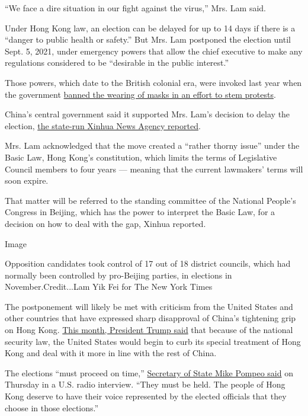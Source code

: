 ``We face a dire situation in our fight against the virus,'' Mrs. Lam
said.

Under Hong Kong law, an election can be delayed for up to 14 days if
there is a ``danger to public health or safety.'' But Mrs. Lam postponed
the election until Sept. 5, 2021, under emergency powers that allow the
chief executive to make any regulations considered to be ``desirable in
the public interest.''

Those powers, which date to the British colonial era, were invoked last
year when the government
\href{https://www.nytimes.com/2019/10/04/world/asia/hong-kong-emergency-powers.html}{banned
the wearing of masks in an effort to stem protests}.

China's central government said it supported Mrs. Lam's decision to
delay the election,
\href{https://xhpfmapi.zhongguowangshi.com/vh512/share/9292212}{the
state-run Xinhua News Agency reported}.

Mrs. Lam acknowledged that the move created a ``rather thorny issue''
under the Basic Law, Hong Kong's constitution, which limits the terms of
Legislative Council members to four years --- meaning that the current
lawmakers' terms will soon expire.

That matter will be referred to the standing committee of the National
People's Congress in Beijing, which has the power to interpret the Basic
Law, for a decision on how to deal with the gap, Xinhua reported.

Image

Opposition candidates took control of 17 out of 18 district councils,
which had normally been controlled by pro-Beijing parties, in elections
in November.Credit...Lam Yik Fei for The New York Times

The postponement will likely be met with criticism from the United
States and other countries that have expressed sharp disapproval of
China's tightening grip on Hong Kong.
\href{https://www.nytimes.com/2020/05/29/us/politics/trump-hong-kong-china-WHO.html}{This
month, President Trump said} that because of the national security law,
the United States would begin to curb its special treatment of Hong Kong
and deal with it more in line with the rest of China.

The elections ``must proceed on time,''
\href{https://www.state.gov/secretary-michael-r-pompeo-with-simon-conway-of-the-joe-pags-show/}{Secretary
of State Mike Pompeo said} on Thursday in a U.S. radio interview. ``They
must be held. The people of Hong Kong deserve to have their voice
represented by the elected officials that they choose in those
elections.''

